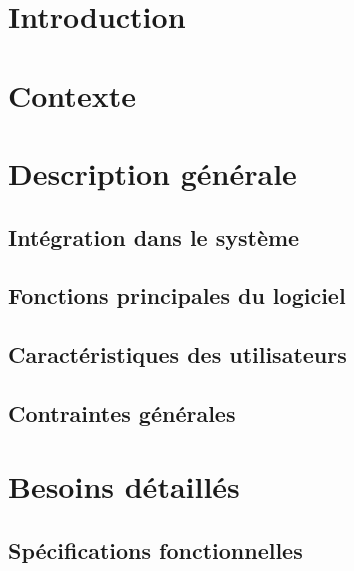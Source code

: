 \documentclass[asi]{picINSA}
\title{\DSE{}}
\author{\Pierre} %
\begin{document}
\couverture{}

 \informationsGenerales{}
%

\tableofcontents

\setcounter{chapter}{0}


\chapter*{Introduction}
\label{intro}


\chapter{Contexte}
\label{contexte}



\chapter{Description générale}

\section{Intégration dans le système}
\label{inte_sys}


\section{Fonctions principales du logiciel}
\label{fonct_princ}


\section{Caractéristiques des utilisateurs}
\label{caract_user}


\section{Contraintes générales}
\label{contraintes_gen}


\chapter{Besoins détaillés}

\section{Spécifications fonctionnelles}
\label{spec_fonct}

\end{document}
